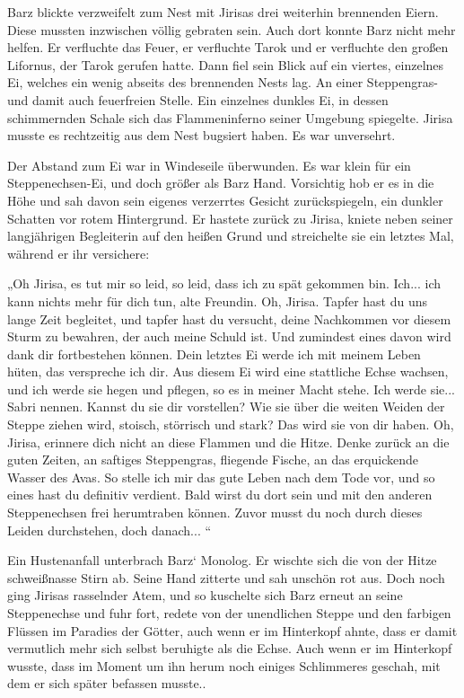 Barz blickte verzweifelt zum Nest mit Jirisas drei weiterhin brennenden Eiern. Diese mussten inzwischen völlig gebraten sein. Auch dort konnte Barz nicht mehr helfen. Er verfluchte das Feuer, er verfluchte Tarok und er verfluchte den großen Lifornus, der Tarok gerufen hatte. Dann fiel sein Blick auf ein viertes, einzelnes Ei, welches ein wenig abseits des brennenden Nests lag. An einer Steppengras- und damit auch feuerfreien Stelle. Ein einzelnes dunkles Ei, in dessen schimmernden Schale sich das Flammeninferno seiner Umgebung spiegelte. Jirisa musste es rechtzeitig aus dem Nest bugsiert haben. Es war unversehrt.

Der Abstand zum Ei war in Windeseile überwunden. Es war klein für ein Steppenechsen-Ei, und doch größer als Barz Hand. Vorsichtig hob er es in die Höhe und sah davon sein eigenes verzerrtes Gesicht zurückspiegeln, ein dunkler Schatten vor rotem Hintergrund. Er hastete zurück zu Jirisa, kniete neben seiner langjährigen Begleiterin auf den heißen Grund und streichelte sie ein letztes Mal, während er ihr versichere:

„Oh Jirisa, es tut mir so leid, so leid, dass ich zu spät gekommen bin. Ich... ich kann nichts mehr für dich tun, alte Freundin. Oh, Jirisa. Tapfer hast du uns lange Zeit begleitet, und tapfer hast du versucht, deine Nachkommen vor diesem Sturm zu bewahren, der auch meine Schuld ist. Und zumindest eines davon wird dank dir fortbestehen können. Dein letztes Ei werde ich mit meinem Leben hüten, das verspreche ich dir. Aus diesem Ei wird eine stattliche Echse wachsen, und ich werde sie hegen und pflegen, so es in meiner Macht stehe. Ich werde sie... Sabri nennen. Kannst du sie dir vorstellen? Wie sie über die weiten Weiden der Steppe ziehen wird, stoisch, störrisch und stark? Das wird sie von dir haben. Oh, Jirisa, erinnere dich nicht an diese Flammen und die Hitze. Denke zurück an die guten Zeiten, an saftiges Steppengras, fliegende Fische, an das erquickende Wasser des Avas. So stelle ich mir das gute Leben nach dem Tode vor, und so eines hast du definitiv verdient. Bald wirst du dort sein und mit den anderen Steppenechsen frei herumtraben können. Zuvor musst du noch durch dieses Leiden durchstehen, doch danach... “

Ein Hustenanfall unterbrach Barz‘ Monolog. Er wischte sich die von der Hitze schweißnasse Stirn ab. Seine Hand zitterte und sah unschön rot aus. Doch noch ging Jirisas rasselnder Atem, und so kuschelte sich Barz erneut an seine Steppenechse und fuhr fort, redete von der unendlichen Steppe und den farbigen Flüssen im Paradies der Götter, auch wenn er im Hinterkopf ahnte, dass er damit vermutlich mehr sich selbst beruhigte als die Echse. Auch wenn er im Hinterkopf wusste, dass im Moment um ihn herum noch einiges Schlimmeres geschah, mit dem er sich später befassen musste..

